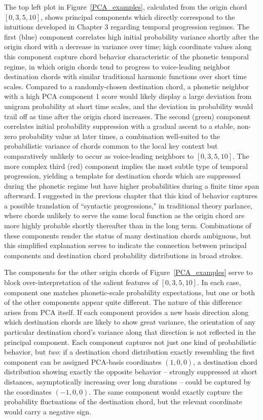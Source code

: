 The top left plot in Figure~\ref{PCA_examples}, calculated from the origin chord $[0,3,5,10]$, shows principal components which directly correspond to the intuitions developed in Chapter 3 regarding temporal progression regimes.  The first (blue) component correlates high initial probability variance shortly after the origin chord with a decrease in variance over time; high coordinate values along this component capture chord behavior characteristic of the phonetic temporal regime, in which origin chords tend to progress to voice-leading neighbor destination chords with similar traditional harmonic functions over short time scales.  Compared to a randomly-chosen destination chord, a phonetic neighbor with a high PCA component 1 score would likely display a large deviation from unigram probability at short time scales, and the deviation in probability would trail off as time after the origin chord increases.  The second (green) component correlates initial probability suppression with a gradual ascent to a stable, non-zero probability value at later times, a combination well-suited to the probabilistic variance of chords common to the local key context but comparatively unlikely to occur as voice-leading neighbors to $[0,3,5,10]$.  The more complex third (red) component implies the most subtle type of temporal progression, yielding a template for destination chords which are suppressed during the phonetic regime but have higher probabilities during a finite time span afterward.  I suggested in the previous chapter that this kind of behavior captures a possible translation of ``syntactic progressions," in traditional theory parlance, where chords unlikely to serve the same local function as the origin chord are more highly probable shortly thereafter than in the long term.  Combinations of these components render the status of many destination chords ambiguous, but this simplified explanation serves to indicate the connection between principal components and destination chord probability distributions in broad strokes.

The components for the other origin chords of Figure~\ref{PCA_examples} serve to block over-interpretation of the salient features of $[0,3,5,10]$.  In each case, component one matches phonetic-scale probability expectations, but one or both of the other components appear quite different.  The nature of this difference arises from PCA itself.  If each component provides a new basis direction along which destination chords are likely to show great variance, the orientation of any particular destination chord's variance along that direction is not reflected in the principal component.  Each component captures not just one kind of probabilistic behavior, but \emph{two}: if a destination chord distribution exactly resembling the first component can be assigned PCA-basis coordinates $(1,0,0)$, a destination chord distribution showing exactly the opposite behavior -- strongly suppressed at short distances, asymptotically increasing over long durations -- could be captured by the coordinates $(-1,0,0)$.  The same component would exactly capture the probability fluctuations of the destination chord, but the relevant coordinate would carry a negative sign.

